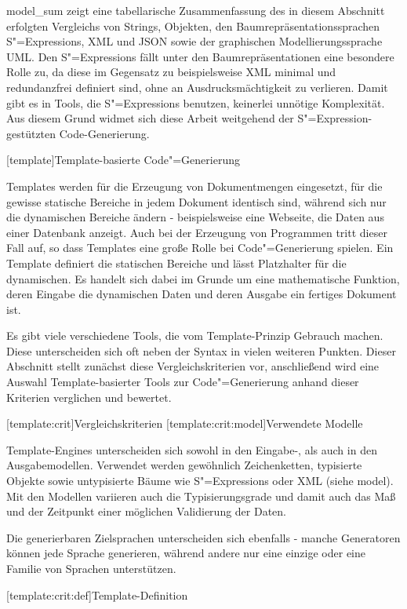 \documentclass[11pt, a4paper, bibgerm]{scrbook}
\newcommand\lchapter{}
\newcommand\lsection{}
\newcommand\lsubsection{}
\newcommand\cref{}
\newcommand\abb{}
\newcommand{\seec}[1]{(siehe \cref{#1})}
\newcommand{\sexp}{S"=Expression}
\newcommand{\sexps}{S"=Expressions}
\newcommand{\cgen}{Code"=Generierung}
\begin{document}
\abb{model_sum} zeigt eine tabellarische Zusammenfassung des in diesem
Abschnitt erfolgten Vergleichs von Strings, Objekten, den
Baumrepräsentationssprachen \sexps{}, XML und JSON sowie der graphischen
Modellierungssprache UML. Den \sexps{} fällt unter den
Baumrepräsentationen eine besondere Rolle zu, da diese im Gegensatz zu
beispielsweise XML minimal und redundanzfrei definiert sind, ohne an
Ausdrucksmächtigkeit zu verlieren. Damit gibt es in Tools, die \sexps{}
benutzen, keinerlei unnötige Komplexität. Aus diesem Grund widmet sich
diese Arbeit weitgehend der \sexp-gestützten Code-Generierung.

\lchapter[template]{Template-basierte \cgen{}}

Templates werden für die Erzeugung von Dokumentmengen eingesetzt, für
die gewisse statische Bereiche in jedem Dokument identisch sind, während
sich nur die dynamischen Bereiche ändern - beispielsweise eine Webseite,
die Daten aus einer Datenbank anzeigt. Auch bei der Erzeugung von
Programmen tritt dieser Fall auf, so dass Templates eine große Rolle bei
\cgen{} spielen. Ein Template definiert die
statischen Bereiche und lässt Platzhalter für die dynamischen. Es
handelt sich dabei im Grunde um eine mathematische Funktion, deren
Eingabe die dynamischen Daten und deren Ausgabe ein fertiges Dokument
ist.

Es gibt viele verschiedene Tools, die vom Template-Prinzip Gebrauch
machen. Diese unterscheiden sich oft neben der Syntax in vielen weiteren
Punkten. Dieser Abschnitt stellt zunächst diese Vergleichskriterien vor,
anschließend wird eine Auswahl Template-basierter Tools zur \cgen{} anhand
dieser Kriterien verglichen und bewertet.

\lsection[template:crit]{Vergleichskriterien}
\lsubsection[template:crit:model]{Verwendete Modelle}

Template-Engines unterscheiden sich sowohl in den Eingabe-, als auch in
den Ausgabemodellen. Verwendet werden gewöhnlich Zeichenketten,
typisierte Objekte sowie untypisierte Bäume wie \sexps{} oder XML
\seec{model}. Mit den Modellen variieren auch die Typisierungsgrade und
damit auch das Maß und der Zeitpunkt einer möglichen Validierung der Daten.

Die generierbaren Zielsprachen unterscheiden sich ebenfalls - manche
Generatoren können jede Sprache generieren, während andere nur eine
einzige oder eine Familie von Sprachen unterstützen.

\lsubsection[template:crit:def]{Template-Definition}
\end{document}
